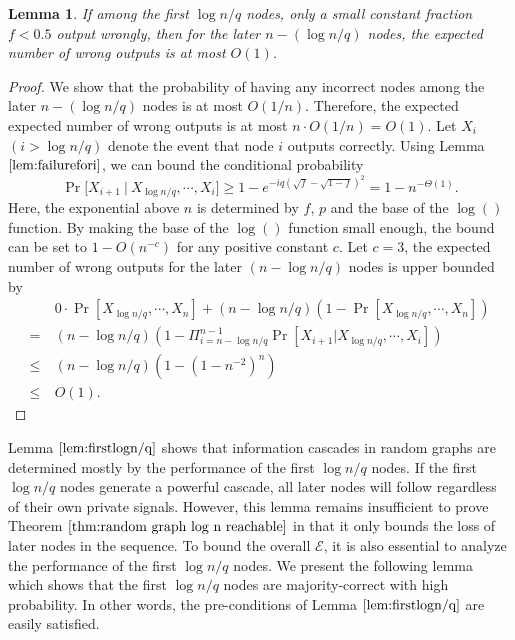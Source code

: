 \documentclass[a4paper,UKenglish]{lipics}
\newtheorem{lem}[thm]{Lemma}
\theoremstyle{definition}
\begin{document}
\begin{lem} \label {lem:firstlogn/q}
If among the first $\log n/q$ nodes, 
	only a small constant fraction $f < 0.5$ output wrongly, 
	then for the later $n - (\log n/q)$ nodes, the expected number of wrong outputs is at most $O(1)$.
\end{lem}

\begin{proof}
We show that the probability of having any incorrect nodes among the later $n - (\log n/q)$ nodes is at most $O(1/n)$.
Therefore, the expected expected number of wrong outputs is at most $n\cdot O(1/n) = O(1)$. 
Let $X_i$ $(i > \log n/q)$ denote the event that node $i$ outputs correctly.
Using Lemma $\ref{lem:failurefori}$, we can bound the conditional probability
\begin{equation*}
	\Pr\Big[
		X_{i+1}~\Big|~ X_{\log n/q}, \dotsb, X_{i}
	\Big]
\ge
	1 - e^{-iq(\sqrt{f} - \sqrt{1-f})^2}
=
	1 - n^{-\Theta(1)}.
\end{equation*}
Here, the exponential above $n$ is determined by $f$, $p$ and the base of the $\log()$ function. 
By making the base of the $\log()$ function small enough, the bound can be set to $1 - O(n^{-c})$ for any positive constant $c$.
Let $c = 3$, the expected number of wrong outputs for the later $(n - \log n/q)$ nodes is upper bounded by
\begin{align*}
&
	0\cdot \Pr[X_{\log n/q}, \dotsb, X_n] + (n - \log n/q)(1 - \Pr[X_{\log n/q}, \dotsb, X_n]) \\
=~ & 
	(n - \log n/q)(1 - \Pi_{i = n - \log n/q}^{n-1}\Pr[X_{i+1} | X_{\log n/q}, \dotsb, X_i]) \\
\le~ &
	(n - \log n/q)(1 - (1 - n^{-2})^n) \\
\le~ &
	O(1).
\end{align*}
\end{proof}

Lemma $\ref{lem:firstlogn/q}$ shows that information cascades in random graphs are determined mostly by the performance of the first $\log n/q$ nodes.
If the first $\log n/q$ nodes generate a powerful cascade, all later nodes will follow regardless of their own private signals.
However, this lemma remains insufficient to prove Theorem $\ref{thm:random graph log n reachable}$
	in that it only bounds the loss of later nodes in the sequence.
To bound the overall $\mathcal{E}$, it is also essential to analyze the performance of the first $\log n/q$ nodes.
We present the following lemma which shows that the first $\log n/q$ nodes are majority-correct with high probability.
In other words, the pre-conditions of Lemma $\ref{lem:firstlogn/q}$ are easily satisfied.
\end{document}
